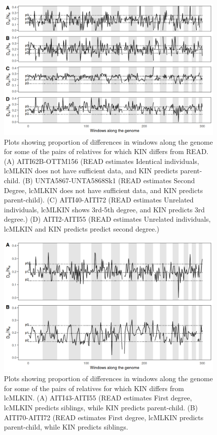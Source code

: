 \documentclass[12pt, letterpaper]{article}
\begin{document}
\begin{figure}[!ht]
    \centering
    \includegraphics[width=18cm]{supplementary_info/plots/egplot1.png}
    \caption{Plots showing proportion of differences in windows along the genome for some of the pairs of relatives for which KIN differs from READ. (A) AITI62B-OTTM156 (READ estimates Identical individuals, lcMLKIN does not have sufficient data, and KIN predicts parent-child. (B) UNTA5867-UNTA5868Sk1 (READ estimates Second Degree, lcMLKIN does not have sufficient data, and KIN predicts parent-child). (C) AITI40-AITI72 (READ estimates Unrelated individuals, lcMLKIN shows 3rd-5th degree, and KIN predicts 3rd degree.)
    (D) AITI2-AITI55 (READ estimates Unrelated individuals, lcMLKIN and KIN predicts predict second degree.)}
    \label{figS8:eg1}
\end{figure}

\begin{figure}[h]
    \centering
    \includegraphics[width=18cm]{supplementary_info/plots/egplot2.png}
    \caption{Plots showing proportion of differences in windows along the genome for some of the pairs of relatives for which KIN differs from lcMLKIN. (A) AITI43-AITI55 (READ estimates First degree, lcMLKIN predicts siblings, while KIN predicts parent-child. (B) AITI70-AITI72 (READ estimates First degree, lcMLKIN predicts parent-child, while KIN predicts siblings.}
    \label{figS9:eg2}
\end{figure}



\end{document}
